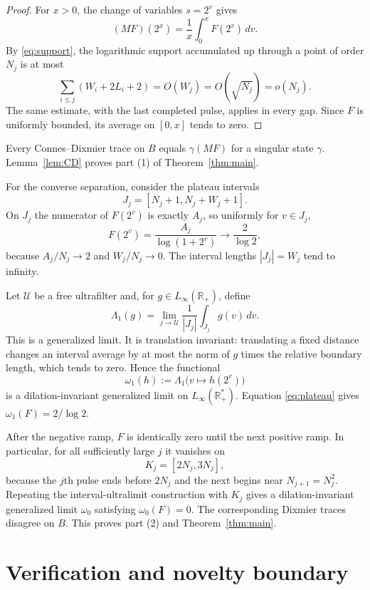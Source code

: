 \documentclass[11pt]{article}
\begin{document}
\begin{proof}
For $x>0$, the change of variables $s=2^v$ gives
\[
 (MF)(2^x)=\frac1x\int_0^x F(2^v)\,dv.
\]
By \eqref{eq:support}, the logarithmic support accumulated up through a
point of order $N_j$ is at most
\[
 \sum_{i\le j}(W_i+2L_i+2)=O(W_j)=O(\sqrt{N_j})=o(N_j).
\]
The same estimate, with the last completed pulse, applies in every gap.
Since $F$ is uniformly bounded, its average on $[0,x]$ tends to zero.
\end{proof}

Every Connes--Dixmier trace on $B$ equals $\gamma(MF)$ for a singular state
$\gamma$.  Lemma~\ref{lem:CD} proves part (1) of
Theorem~\ref{thm:main}.

For the converse separation, consider the plateau intervals
\[
 J_j=[N_j+1,N_j+W_j+1].
\]
On $J_j$ the numerator of $F(2^v)$ is exactly $A_j$, so uniformly for
$v\in J_j$,
\begin{equation}\label{eq:plateau}
 F(2^v)=\frac{A_j}{\log(1+2^v)}
 \longrightarrow \frac{2}{\log2},
\end{equation}
because $A_j/N_j\to2$ and $W_j/N_j\to0$.  The interval lengths
$|J_j|=W_j$ tend to infinity.

Let $\mathcal U$ be a free ultrafilter and, for $g\in L_\infty(\mathbb R_+)$,
define
\[
 \Lambda_1(g)=\lim_{j\to\mathcal U}
   \frac1{|J_j|}\int_{J_j}g(v)\,dv.
\]
This is a generalized limit.  It is translation invariant: translating a
fixed distance changes an interval average by at most the norm of $g$ times
the relative boundary length, which tends to zero.  Hence the functional
\[
 \omega_1(h):=\Lambda_1\bigl(v\mapsto h(2^v)\bigr)
\]
is a dilation-invariant generalized limit on $L_\infty(\mathbb R_+^*)$.
Equation \eqref{eq:plateau} gives
$\omega_1(F)=2/\log2$.

After the negative ramp, $F$ is identically zero until the next positive
ramp.  In particular, for all sufficiently large $j$ it vanishes on
\[
 K_j=[2N_j,3N_j],
\]
because the $j$th pulse ends before $2N_j$ and the next begins near
$N_{j+1}=N_j^2$.  Repeating the interval-ultralimit construction with
$K_j$ gives a dilation-invariant generalized limit $\omega_0$ satisfying
$\omega_0(F)=0$.  The corresponding Dixmier traces disagree on $B$.
This proves part (2) and Theorem~\ref{thm:main}.

\section{Verification and novelty boundary}
\end{document}
